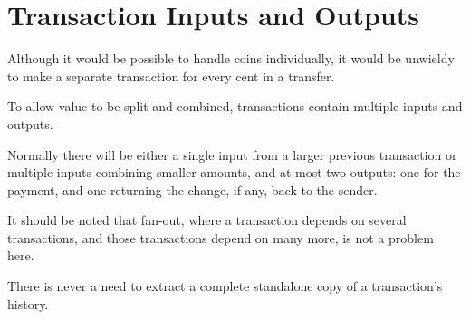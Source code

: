 \section{Transaction Inputs and Outputs}

Although it would be possible to handle coins individually, it would be unwieldy to make a separate transaction for every cent in a transfer.

To allow value to be split and combined, transactions contain multiple inputs and outputs.

Normally there will be either a single input from a larger previous transaction or multiple inputs combining smaller amounts, and at most two outputs: one for the payment, and one returning the change, if any, back to the sender.

It should be noted that fan-out, where a transaction depends on several transactions, and those transactions depend on many more, is not a problem here.

There is never a need to extract a complete standalone copy of a transaction's history.